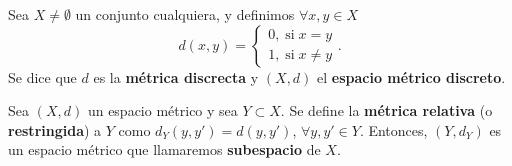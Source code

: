 \begin{definition}
Sea $\displaystyle X \neq \emptyset $ un conjunto cualquiera, y definimos $\displaystyle \forall x,y \in X $ 
\[d\left(x,y\right) = 
\begin{cases}
0, \; \text{si} \; x = y \\
1, \; \text{si} \; x \neq y
\end{cases}
.\]
Se dice que $\displaystyle d $ es la \textbf{métrica discrecta} y $\displaystyle \left(X, d\right) $ el \textbf{espacio métrico discreto}.
\end{definition}
\begin{definition}
Sea $\displaystyle \left(X, d\right) $ un espacio métrico y sea $\displaystyle Y \subset X $. Se define la \textbf{métrica relativa} (o \textbf{restringida}) a $\displaystyle Y $ como $\displaystyle d _{Y}\left(y, y'\right)  = d\left(y, y'\right) $, $\displaystyle \forall y, y' \in Y $. Entonces, $\displaystyle \left(Y, d _{Y}\right) $ es un espacio métrico que llamaremos \textbf{subespacio} de $\displaystyle X $.
\end{definition}
